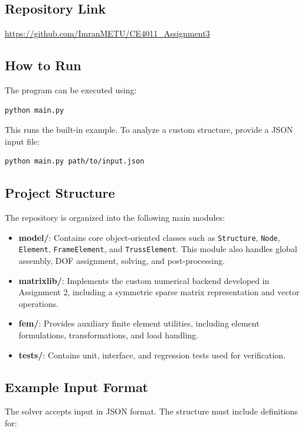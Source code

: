 \subsection*{Repository Link}
\url{https://github.com/ImranMETU/CE4011_Assignment3}

\subsection*{How to Run}
The program can be executed using:

\begin{verbatim}
python main.py
\end{verbatim}

This runs the built-in example. To analyze a custom structure, provide a JSON input file:

\begin{verbatim}
python main.py path/to/input.json
\end{verbatim}

\subsection*{Project Structure}
The repository is organized into the following main modules:

\begin{itemize}
  \item \textbf{model/}: Contains core object-oriented classes such as \texttt{Structure}, \texttt{Node}, \texttt{Element}, \texttt{FrameElement}, and \texttt{TrussElement}. This module also handles global assembly, DOF assignment, solving, and post-processing.

  \item \textbf{matrixlib/}: Implements the custom numerical backend developed in Assignment 2, including a symmetric sparse matrix representation and vector operations.

  \item \textbf{fem/}: Provides auxiliary finite element utilities, including element formulations, transformations, and load handling.

  \item \textbf{tests/}: Contains unit, interface, and regression tests used for verification.
\end{itemize}

\subsection*{Example Input Format}
The solver accepts input in JSON format. The structure must include definitions for:

